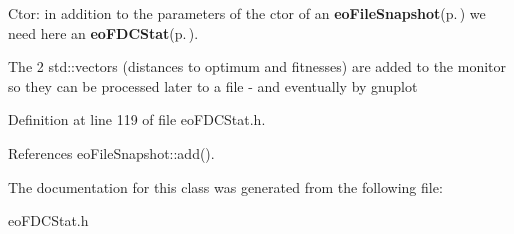 Ctor: in addition to the parameters of the ctor of an {\bf eo\-File\-Snapshot}{\rm (p.\,\pageref{classeo_file_snapshot})} we need here an {\bf eo\-FDCStat}{\rm (p.\,\pageref{classeo_f_d_c_stat})}. 

The 2 std::vectors (distances to optimum and fitnesses) are added to the monitor so they can be processed later to a file - and eventually by gnuplot 

Definition at line 119 of file eo\-FDCStat.h.

References eo\-File\-Snapshot::add().

The documentation for this class was generated from the following file:\begin{CompactItemize}
\item 
eo\-FDCStat.h\end{CompactItemize}

